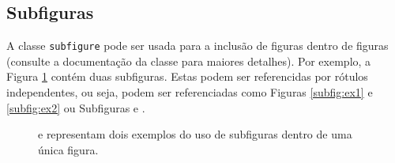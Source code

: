 \subsection{Subfiguras}
\label{subsec:subfigs} 
A classe \verb|subfigure| pode ser usada para a inclusão de figuras dentro de
figuras (consulte a documentação da classe para maiores detalhes). Por exemplo,
a Figura \ref{fig:subfiguras} contém duas subfiguras. Estas podem ser
referencidas por rótulos independentes, ou seja, podem ser referenciadas como
Figuras \ref{subfig:ex1} e \ref{subfig:ex2} ou Subfiguras  e
.
\begin{figure}[h]
  \centering
   \qquad
  \caption{{} e {} representam dois exemplos do uso de subfiguras dentro de uma única figura.}
  \label{fig:subfiguras}
\end{figure}

